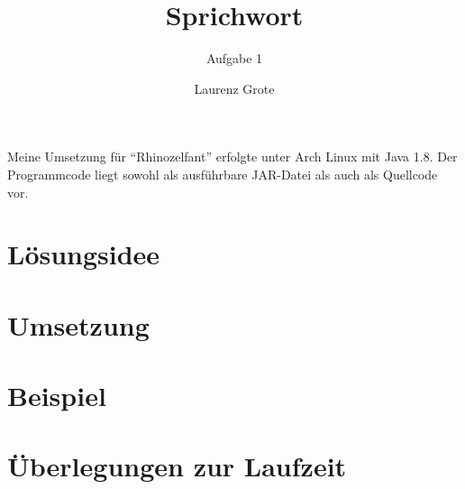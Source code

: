 \documentclass[parskip=full, DIV=14]{scrartcl}
\begin{document}
	\titlehead{35. Bundeswettbewerb Informatik \hfill Team 00001, Teilnahme 6745}
	\title{Sprichwort}
	\subtitle{Aufgabe 1}
	\author{Laurenz Grote}
	\date{}
	\maketitle
	\tableofcontents
	
	\vspace {3em}
	Meine Umsetzung für "`Rhinozelfant"' erfolgte unter Arch Linux mit Java 1.8. Der Programmcode liegt sowohl als ausführbare JAR-Datei als auch als Quellcode vor.
	\clearpage
	\section{Lösungsidee}
		
	\clearpage
	\section{Umsetzung}
		
	\clearpage
	\section{Beispiel}
		
	\section{Überlegungen zur Laufzeit}
		
\end{document}
